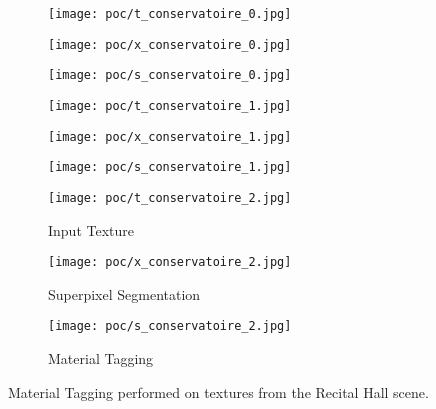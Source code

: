 \begin{figure}
    \centering
    \begin{subfigure}[t]{0.3\textwidth}
       \centering
       \texttt{[image: poc/t\_conservatoire\_0.jpg]}

    \end{subfigure}
    \begin{subfigure}[t]{0.3\textwidth}
       \centering
       \texttt{[image: poc/x\_conservatoire\_0.jpg]}

    \end{subfigure}
    \begin{subfigure}[t]{0.3\textwidth}
        \centering
        \texttt{[image: poc/s\_conservatoire\_0.jpg]}
     \end{subfigure}


    \addvspace{\baselineskip}


    \centering
    \begin{subfigure}[t]{0.3\textwidth}
       \centering
       \texttt{[image: poc/t\_conservatoire\_1.jpg]}

    \end{subfigure}
    \begin{subfigure}[t]{0.3\textwidth}
       \centering
       \texttt{[image: poc/x\_conservatoire\_1.jpg]}

    \end{subfigure}
    \begin{subfigure}[t]{0.3\textwidth}
        \centering
        \texttt{[image: poc/s\_conservatoire\_1.jpg]}
     \end{subfigure}


    \addvspace{\baselineskip}

    
    \centering
    \begin{subfigure}[t]{0.3\textwidth}
       \centering
       \texttt{[image: poc/t\_conservatoire\_2.jpg]}
       \caption{Input Texture}
    \end{subfigure}
    \begin{subfigure}[t]{0.3\textwidth}
       \centering
       \texttt{[image: poc/x\_conservatoire\_2.jpg]}
       \caption{Superpixel Segmentation}
    \end{subfigure}
    \begin{subfigure}[t]{0.3\textwidth}
        \centering
        \texttt{[image: poc/s\_conservatoire\_2.jpg]}
        \caption{Material Tagging}
     \end{subfigure}
 

\caption{Material Tagging performed on textures from the Recital Hall scene.}
\label{fig:recital-hall-superpixels}
\end{figure}

